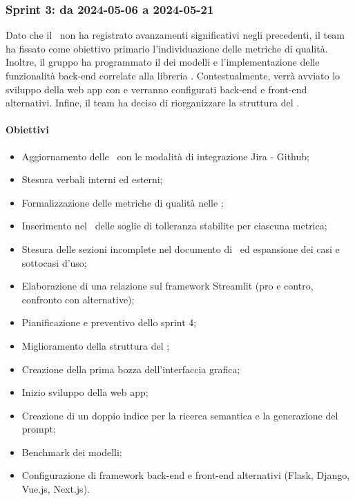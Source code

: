 \subsubsection{Sprint 3: da 2024-05-06 a 2024-05-21}
\par Dato che il \PdQ\ non ha registrato avanzamenti significativi negli  precedenti, il team ha fissato come obiettivo primario l'individuazione delle metriche di qualità. Inoltre, il gruppo ha programmato il  dei modelli e l'implementazione delle funzionalità back-end correlate alla libreria . Contestualmente, verrà avviato lo sviluppo della web app con  e verranno configurati  back-end e front-end alternativi. Infine, il team ha deciso di riorganizzare la struttura del \PdP.

\paragraph{Obiettivi}
\begin{itemize}
  \item Aggiornamento delle \NdP\ con le modalità di integrazione Jira - Github;
  \item Stesura verbali interni ed esterni;
  \item Formalizzazione delle metriche di qualità nelle \NdP;
  \item Inserimento nel \PdQ\ delle soglie di tolleranza stabilite per ciascuna metrica;
  \item Stesura delle sezioni incomplete nel documento di \AdR\ ed espansione dei casi e sottocasi d'uso;
  \item Elaborazione di una relazione sul framework Streamlit (pro e contro, confronto con alternative);
  \item Pianificazione e preventivo dello sprint 4;
  \item Miglioramento della struttura del \PdP;
  \item Creazione della prima bozza dell'interfaccia grafica;
  \item Inizio sviluppo della web app;
  \item Creazione di un doppio indice per la ricerca semantica e la generazione del prompt;
  \item Benchmark dei modelli;
  \item Configurazione di framework back-end e front-end alternativi (Flask, Django, Vue.js, Next.js).
\end{itemize}

